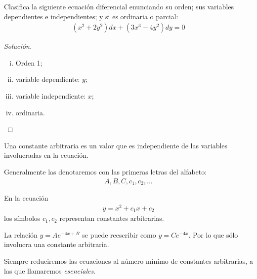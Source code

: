 \begin{resuelto}
	Clasifica la siguiente ecuación diferencial enunciando su orden; sus variables dependientes e independientes; y si es ordinaria o parcial:
\begin{align}
	\left(x^{2}+2y^{2}\right)dx +\left(3x^{3}-4y^{2}\right)dy=0
\end{align}
\end{resuelto}
\begin{proof}[Solución]
	\begin{enumerate}[(i)]
		\item Orden 1;
		\item variable dependiente: $ y  $;
		\item variable independiente: $ x $;
		\item ordinaria.
	\end{enumerate}
\end{proof}




	\begin{definicion}
		Una constante arbitraria es un valor que es independiente de las variables involucradas en la ecuación.
	\end{definicion}

	\begin{observacion}
		Generalmente las denotaremos con las primeras letras del alfabeto:
	\begin{align}
		A,B,C,c_{1},c_{2},...
	\end{align}
	\end{observacion}


	\begin{ejemplo}
		En la ecuación
		\begin{align}
		y = x^{2}+c_{1}x+c_{2}
		\end{align}
		los símbolos $ c_{1}, c_{2} $ representan constantes arbitrarias.

	\end{ejemplo}



	\begin{ejemplo}
		La relación $ y = Ae^{-4x+B} $ se puede reescribir como $ y = Ce^{-4x} $.  Por lo que sólo involucra una constante arbitraria.
	\end{ejemplo}


\begin{observacion}

	Siempre reduciremos las ecuaciones al número mínimo de constantes arbitrarias, a las que llamaremos \emph{esenciales}.

\end{observacion}


